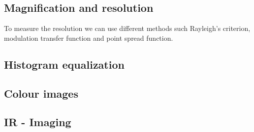 \subsection{Magnification and resolution}
To measure the resolution we can use different methods such Rayleigh's criterion, modulation transfer function and point spread function. 

\subsection{Histogram equalization}

\subsection{Colour images}

\subsection{IR - Imaging}
